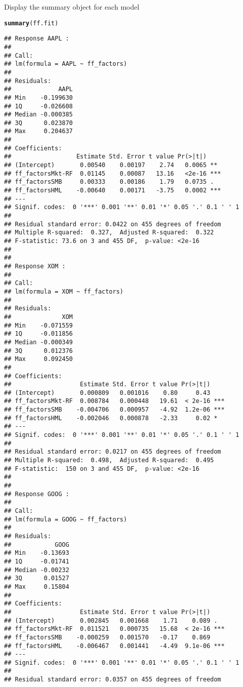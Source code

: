 \documentclass[a4paper]{article}\usepackage[]{graphicx}\usepackage[]{color}
\makeatletter
\newcommand{\hlkwd}[1]{\textcolor[rgb]{0.737,0.353,0.396}{\textbf{#1}}}%
\newenvironment{kframe}{%
 \def\at@end@of@kframe{}%
 \ifinner\ifhmode%
  \def\at@end@of@kframe{\end{minipage}}%
  \begin{minipage}{\columnwidth}%
 \fi\fi%
 \def\FrameCommand##1{\hskip\@totalleftmargin \hskip-\fboxsep
 \colorbox{shadecolor}{##1}\hskip-\fboxsep
     \hskip-\linewidth \hskip-\@totalleftmargin \hskip\columnwidth}%
 \MakeFramed {\advance\hsize-\width
   \@totalleftmargin\z@ \linewidth\hsize
   \@setminipage}}%
 {\par\unskip\endMakeFramed%
 \at@end@of@kframe}
\newenvironment{knitrout}{}{} %
\makeatother
\begin{document}
Display the summary object for each model
\begin{knitrout}
\color{fgcolor}\begin{kframe}
\begin{alltt}
\hlkwd{summary}(ff.fit)
\end{alltt}
\begin{verbatim}
## Response AAPL :
## 
## Call:
## lm(formula = AAPL ~ ff_factors)
## 
## Residuals:
##             AAPL
## Min    -0.199630
## 1Q     -0.026608
## Median -0.000385
## 3Q      0.023870
## Max     0.204637
## 
## Coefficients:
##                  Estimate Std. Error t value Pr(>|t|)    
## (Intercept)       0.00540    0.00197    2.74   0.0065 ** 
## ff_factorsMkt-RF  0.01145    0.00087   13.16   <2e-16 ***
## ff_factorsSMB     0.00333    0.00186    1.79   0.0735 .  
## ff_factorsHML    -0.00640    0.00171   -3.75   0.0002 ***
## ---
## Signif. codes:  0 '***' 0.001 '**' 0.01 '*' 0.05 '.' 0.1 ' ' 1
## 
## Residual standard error: 0.0422 on 455 degrees of freedom
## Multiple R-squared:  0.327,	Adjusted R-squared:  0.322 
## F-statistic: 73.6 on 3 and 455 DF,  p-value: <2e-16
## 
## 
## Response XOM :
## 
## Call:
## lm(formula = XOM ~ ff_factors)
## 
## Residuals:
##              XOM
## Min    -0.071559
## 1Q     -0.011856
## Median -0.000349
## 3Q      0.012376
## Max     0.092450
## 
## Coefficients:
##                   Estimate Std. Error t value Pr(>|t|)    
## (Intercept)       0.000809   0.001016    0.80     0.43    
## ff_factorsMkt-RF  0.008784   0.000448   19.61  < 2e-16 ***
## ff_factorsSMB    -0.004706   0.000957   -4.92  1.2e-06 ***
## ff_factorsHML    -0.002046   0.000878   -2.33     0.02 *  
## ---
## Signif. codes:  0 '***' 0.001 '**' 0.01 '*' 0.05 '.' 0.1 ' ' 1
## 
## Residual standard error: 0.0217 on 455 degrees of freedom
## Multiple R-squared:  0.498,	Adjusted R-squared:  0.495 
## F-statistic:  150 on 3 and 455 DF,  p-value: <2e-16
## 
## 
## Response GOOG :
## 
## Call:
## lm(formula = GOOG ~ ff_factors)
## 
## Residuals:
##            GOOG
## Min    -0.13693
## 1Q     -0.01741
## Median -0.00232
## 3Q      0.01527
## Max     0.15804
## 
## Coefficients:
##                   Estimate Std. Error t value Pr(>|t|)    
## (Intercept)       0.002845   0.001668    1.71    0.089 .  
## ff_factorsMkt-RF  0.011521   0.000735   15.68  < 2e-16 ***
## ff_factorsSMB    -0.000259   0.001570   -0.17    0.869    
## ff_factorsHML    -0.006467   0.001441   -4.49  9.1e-06 ***
## ---
## Signif. codes:  0 '***' 0.001 '**' 0.01 '*' 0.05 '.' 0.1 ' ' 1
## 
## Residual standard error: 0.0357 on 455 degrees of freedom

\end{verbatim}
\end{kframe}
\end{knitrout}
\end{document}
